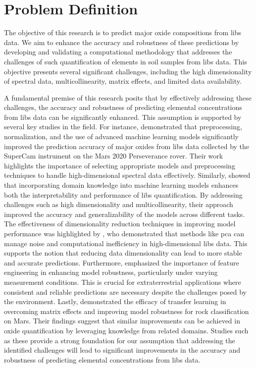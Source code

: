 \section{Problem Definition}\label{sec:problem_definition}
The objective of this research is to predict major oxide compositions from \gls{libs} data.
We aim to enhance the accuracy and robustness of these predictions by developing and validating a computational methodology that addresses the challenges of such quantification of elements in soil samples from \gls{libs} data. 
This objective presents several significant challenges, including the high dimensionality of spectral data, multicollinearity, matrix effects, and limited data availability.

A fundamental premise of this research posits that by effectively addressing these challenges, the accuracy and robustness of predicting elemental concentrations from \gls{libs} data can be significantly enhanced. This assumption is supported by several key studies in the field.
For instance, \citet{andersonPostlandingMajorElement2022} demonstrated that preprocessing, normalization, and the use of advanced machine learning models significantly improved the prediction accuracy of major oxides from \gls{libs} data collected by the SuperCam instrument on the Mars 2020 Perseverance rover. Their work highlights the importance of selecting appropriate models and preprocessing techniques to handle high-dimensional spectral data effectively.
Similarly, \citet{song_DF-K-ELM} showed that incorporating domain knowledge into machine learning models enhances both the interpretability and performance of \gls{libs} quantification. By addressing challenges such as high dimensionality and multicollinearity, their approach improved the accuracy and generalizability of the models across different tasks.
The effectiveness of dimensionality reduction techniques in improving model performance was highlighted by \citet{rezaei_dimensionality_reduction}, who demonstrated that methods like \gls{pca} can manage noise and computational inefficiency in high-dimensional \gls{libs} data. This supports the notion that reducing data dimensionality can lead to more stable and accurate predictions.
Furthermore, \citet{jeonEffectsFeatureEngineering2024} emphasized the importance of feature engineering in enhancing model robustness, particularly under varying measurement conditions. This is crucial for extraterrestrial applications where consistent and reliable predictions are necessary despite the challenges posed by the environment.
Lastly, \citet{sunMachineLearningTransfer2021} demonstrated the efficacy of transfer learning in overcoming matrix effects and improving model robustness for rock classification on Mars. Their findings suggest that similar improvements can be achieved in oxide quantification by leveraging knowledge from related domains.
Studies such as these provide a strong foundation for our assumption that addressing the identified challenges will lead to significant improvements in the accuracy and robustness of predicting elemental concentrations from \gls{libs} data.

